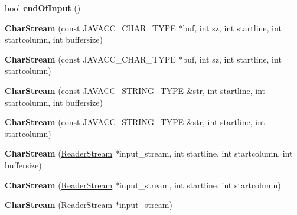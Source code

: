 \begin{DoxyCompactItemize}
bool {\bfseries end\+Of\+Input} ()
\item 
\mbox{\label{classvhdl_1_1parser_1_1_char_stream_acf7477162d40d6685ec22bbb9fe27cb5}} 
{\bfseries Char\+Stream} (const J\+A\+V\+A\+C\+C\+\_\+\+C\+H\+A\+R\+\_\+\+T\+Y\+PE $\ast$buf, int sz, int startline, int startcolumn, int buffersize)
\item 
\mbox{\label{classvhdl_1_1parser_1_1_char_stream_a6c5b21048c7fc72980a39baf5cdda865}} 
{\bfseries Char\+Stream} (const J\+A\+V\+A\+C\+C\+\_\+\+C\+H\+A\+R\+\_\+\+T\+Y\+PE $\ast$buf, int sz, int startline, int startcolumn)
\item 
\mbox{\label{classvhdl_1_1parser_1_1_char_stream_afdec6175c31615bddb10d937a740ff5d}} 
{\bfseries Char\+Stream} (const J\+A\+V\+A\+C\+C\+\_\+\+S\+T\+R\+I\+N\+G\+\_\+\+T\+Y\+PE \&str, int startline, int startcolumn, int buffersize)
\item 
\mbox{\label{classvhdl_1_1parser_1_1_char_stream_aad7f99f71d1af1a9496f56e09a819333}} 
{\bfseries Char\+Stream} (const J\+A\+V\+A\+C\+C\+\_\+\+S\+T\+R\+I\+N\+G\+\_\+\+T\+Y\+PE \&str, int startline, int startcolumn)
\item 
\mbox{\label{classvhdl_1_1parser_1_1_char_stream_a3da31e2203a8bcdf92b4726e83535104}} 
{\bfseries Char\+Stream} (\mbox{\hyperlink{class_reader_stream}{Reader\+Stream}} $\ast$input\+\_\+stream, int startline, int startcolumn, int buffersize)
\item 
\mbox{\label{classvhdl_1_1parser_1_1_char_stream_a7a3b115d9cb6f671539a8db6630f515c}} 
{\bfseries Char\+Stream} (\mbox{\hyperlink{class_reader_stream}{Reader\+Stream}} $\ast$input\+\_\+stream, int startline, int startcolumn)
\item 
\mbox{\label{classvhdl_1_1parser_1_1_char_stream_a82949d505a06f19999787ee61f85f7a7}} 
{\bfseries Char\+Stream} (\mbox{\hyperlink{class_reader_stream}{Reader\+Stream}} $\ast$input\+\_\+stream)
\item 
\mbox{\label{classvhdl_1_1parser_1_1_char_stream_a2c28db2d646530d6fc446bbfbe3a1c9d}} 

\end{DoxyCompactItemize}
